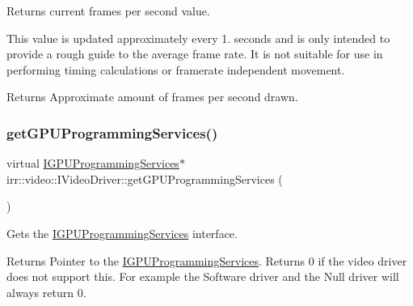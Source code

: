 Returns current frames per second value. 

This value is updated approximately every 1. seconds and is only intended to provide a rough guide to the average frame rate. It is not suitable for use in performing timing calculations or framerate independent movement. \begin{DoxyReturn}{Returns}
Approximate amount of frames per second drawn. 
\end{DoxyReturn}
\mbox{\label{classirr_1_1video_1_1IVideoDriver_ad2098a408bbe9dad8053c3f4aea7d856}} 
\subsubsection{\texorpdfstring{get\+G\+P\+U\+Programming\+Services()}{getGPUProgrammingServices()}\hspace{0.1cm}{\footnotesize\ttfamily [1/2]}}
{\footnotesize\ttfamily virtual \hyperlink{classirr_1_1video_1_1IGPUProgrammingServices}{I\+G\+P\+U\+Programming\+Services}$\ast$ irr\+::video\+::\+I\+Video\+Driver\+::get\+G\+P\+U\+Programming\+Services (\begin{DoxyParamCaption}{ }\end{DoxyParamCaption})\hspace{0.3cm}{\ttfamily [pure virtual]}}



Gets the \hyperlink{classirr_1_1video_1_1IGPUProgrammingServices}{I\+G\+P\+U\+Programming\+Services} interface. 

\begin{DoxyReturn}{Returns}
Pointer to the \hyperlink{classirr_1_1video_1_1IGPUProgrammingServices}{I\+G\+P\+U\+Programming\+Services}. Returns 0 if the video driver does not support this. For example the Software driver and the Null driver will always return 0. 
\end{DoxyReturn}
\mbox{\label{classirr_1_1video_1_1IVideoDriver_ad2098a408bbe9dad8053c3f4aea7d856}} 
